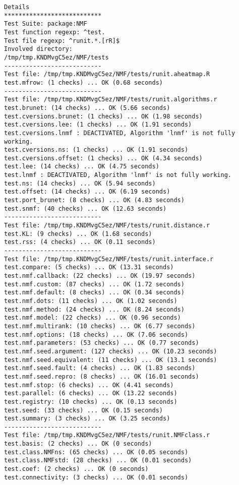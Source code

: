\documentclass[10pt]{article}
\begin{document}
\begin{verbatim}
Details 
*************************** 
Test Suite: package:NMF 
Test function regexp: ^test. 
Test file regexp: ^runit.*.[rR]$ 
Involved directory: 
/tmp/tmp.KNDMvgC5ez/NMF/tests 
--------------------------- 
Test file: /tmp/tmp.KNDMvgC5ez/NMF/tests/runit.aheatmap.R 
test.mfrow: (1 checks) ... OK (0.68 seconds)
--------------------------- 
Test file: /tmp/tmp.KNDMvgC5ez/NMF/tests/runit.algorithms.r 
test.brunet: (14 checks) ... OK (5.66 seconds)
test.cversions.brunet: (1 checks) ... OK (1.98 seconds)
test.cversions.lee: (1 checks) ... OK (1.91 seconds)
test.cversions.lnmf : DEACTIVATED, Algorithm 'lnmf' is not fully working.
test.cversions.ns: (1 checks) ... OK (1.91 seconds)
test.cversions.offset: (1 checks) ... OK (4.34 seconds)
test.lee: (14 checks) ... OK (4.75 seconds)
test.lnmf : DEACTIVATED, Algorithm 'lnmf' is not fully working.
test.ns: (14 checks) ... OK (5.94 seconds)
test.offset: (14 checks) ... OK (6.19 seconds)
test.port_brunet: (8 checks) ... OK (4.83 seconds)
test.snmf: (40 checks) ... OK (12.63 seconds)
--------------------------- 
Test file: /tmp/tmp.KNDMvgC5ez/NMF/tests/runit.distance.r 
test.KL: (9 checks) ... OK (1.68 seconds)
test.rss: (4 checks) ... OK (0.11 seconds)
--------------------------- 
Test file: /tmp/tmp.KNDMvgC5ez/NMF/tests/runit.interface.r 
test.compare: (5 checks) ... OK (13.31 seconds)
test.nmf.callback: (22 checks) ... OK (19.97 seconds)
test.nmf.custom: (87 checks) ... OK (1.72 seconds)
test.nmf.default: (8 checks) ... OK (0.34 seconds)
test.nmf.dots: (11 checks) ... OK (1.02 seconds)
test.nmf.method: (24 checks) ... OK (8.24 seconds)
test.nmf.model: (22 checks) ... OK (0.96 seconds)
test.nmf.multirank: (10 checks) ... OK (6.77 seconds)
test.nmf.options: (18 checks) ... OK (7.06 seconds)
test.nmf.parameters: (53 checks) ... OK (0.77 seconds)
test.nmf.seed.argument: (127 checks) ... OK (10.23 seconds)
test.nmf.seed.equivalent: (11 checks) ... OK (13.1 seconds)
test.nmf.seed.fault: (4 checks) ... OK (1.83 seconds)
test.nmf.seed.repro: (8 checks) ... OK (16.01 seconds)
test.nmf.stop: (6 checks) ... OK (4.41 seconds)
test.parallel: (6 checks) ... OK (13.22 seconds)
test.registry: (10 checks) ... OK (0.13 seconds)
test.seed: (33 checks) ... OK (0.15 seconds)
test.summary: (3 checks) ... OK (3.25 seconds)
--------------------------- 
Test file: /tmp/tmp.KNDMvgC5ez/NMF/tests/runit.NMFclass.r 
test.basis: (2 checks) ... OK (0 seconds)
test.class.NMFns: (65 checks) ... OK (0.05 seconds)
test.class.NMFstd: (28 checks) ... OK (0.01 seconds)
test.coef: (2 checks) ... OK (0 seconds)
test.connectivity: (3 checks) ... OK (0.01 seconds)

\end{verbatim}
\end{document}
